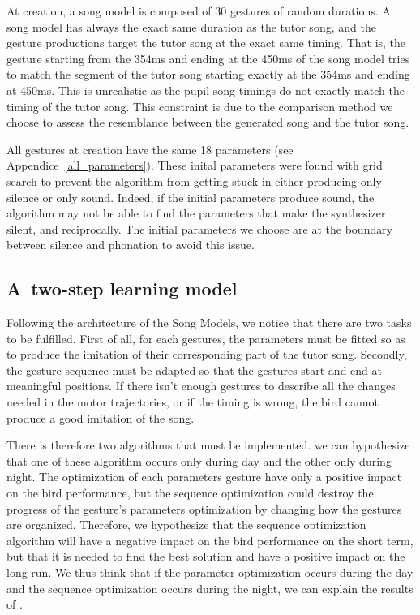\documentclass{report}
\begin{document}
At creation, a song model is composed of 30 gestures of random durations. A song
model has always the exact same duration as the tutor song, and the gesture
productions target the tutor song at the exact same timing. That is, the gesture
starting from the 354ms and ending at the 450ms of the song model tries to match
the segment of the tutor song starting exactly at the 354ms and ending at 450ms.
This is unrealistic as the pupil song timings do not exactly match the timing of
the tutor song. This constraint is due to the comparison method we choose to
assess the resemblance between the generated song and the tutor song.

All gestures at creation have the same 18 parameters (see
Appendice~\ref{all_parameters}). These inital parameters were found with grid
search to prevent the algorithm from getting stuck in either producing only
silence or only sound. Indeed, if the initial parameters produce sound, the
algorithm may not be able to find the parameters that make the synthesizer
silent, and reciprocally. The initial parameters we choose are at the boundary
between silence and phonation to avoid this issue.

\subsection{A two-step learning model} \label{two-step-learning-model}

Following the architecture of the Song Models, we notice that there are two
tasks to be fulfilled. First of all, for each gestures, the  parameters must be
fitted so as to produce the imitation of their corresponding part of the tutor
song. Secondly, the gesture sequence must be adapted so that the gestures start
and end at meaningful positions. If there isn't enough gestures to describe all
the changes needed in the motor trajectories, or if the timing is wrong, the
bird cannot produce a good imitation of the song.


There is therefore two algorithms that must be implemented. we can hypothesize
that one of these algorithm occurs only during day and the other only during
night. The optimization of each parameters gesture have only a positive impact
on the bird performance, but the sequence optimization could destroy the
progress of the gesture's parameters optimization by changing how the gestures
are organized. Therefore, we hypothesize that the sequence optimization
algorithm will have a negative impact on the bird performance on the short term,
but that it is needed to find the best solution and have a positive impact on
the long run. We thus think that if the parameter optimization occurs during the
day and the sequence optimization occurs during the night, we can explain the
results of \textcite{deregnaucourt_how_2005}.
\end{document}
